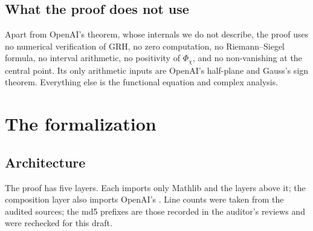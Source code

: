 \documentclass[11pt]{article}
\theoremstyle{definition}
\begin{document}
\subsection{What the proof does not use}

Apart from OpenAI's theorem, whose internals we do not describe, the proof uses no numerical verification of GRH, no zero computation, no Riemann--Siegel formula, no interval arithmetic, no positivity of $\Phi_\chi$, and no non-vanishing at the central point. Its only arithmetic inputs are OpenAI's half-plane and Gauss's sign theorem. Everything else is the functional equation and complex analysis.

\section{The formalization}\label{sec:formal}

\subsection{Architecture}

The proof has five layers. Each imports only Mathlib and the layers above it; the composition layer also imports OpenAI's . Line counts were taken from the audited sources; the md5 prefixes are those recorded in the auditor's reviews \cite{bbrecords} and were rechecked for this draft.
\end{document}
